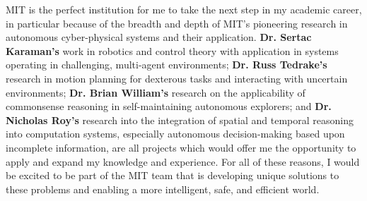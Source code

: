 \documentclass[11pt]{letter}
\begin{document}
MIT is the perfect institution for me to take the next step in my academic career, in particular because of the breadth and depth of MIT’s pioneering research in autonomous cyber-physical systems and their application.  \textbf{Dr. Sertac Karaman's} work in robotics and control theory with application in systems operating in challenging, multi-agent environments; \textbf{Dr. Russ Tedrake's} research in motion planning for dexterous tasks and interacting with uncertain environments; \textbf{Dr. Brian William's} research on the applicability of commonsense reasoning in self-maintaining autonomous explorers; and \textbf{Dr. Nicholas Roy's} research into the integration of spatial and temporal reasoning into computation systems, especially autonomous decision-making based upon incomplete information, are all projects which would offer me the opportunity to apply and expand my knowledge and experience.  For all of these reasons, I would be excited to be part of the MIT team that is developing unique solutions to these problems and enabling a more intelligent, safe, and efficient world.


\begin{comment}
{\bf \emph{References}}

[1] "Cyber-Physical Systems." Baheti and Gill

[2] "Optimization and Control of Cyber-Physical Vehicle Systems." Bradley and Atkins

\end{comment}
\end{document}

